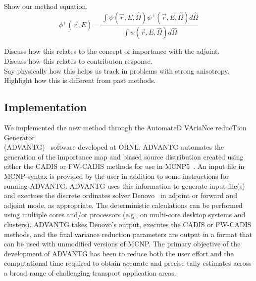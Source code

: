 \documentclass[12pt]{article}
\begin{document}
Show our method equation. \\


\begin{equation} 
\label{eq:angularhybrid}
\phi^{+}(\vec{r},E) = \frac{\int \psi(\vec {r} ,E,\hat{\Omega})\psi^+(\vec {r} ,E,\hat{\Omega})d\hat\Omega }{\int\psi(\vec {r} ,E,\hat{\Omega})d\hat\Omega}
\end{equation}


Discuss how this relates to the concept of importance with the adjoint. \\
Discuss how this relates to contributon response. \\
Say physically how this helps us track in problems with strong anisotropy. \\
Highlight how this is different from past methods.

%

\subsection{Implementation}
\label{subsect::implementation}

We implemented the new method through the AutomateD VAriaNce reducTion Generator\\ (ADVANTG)~\cite{wagner_automated_2002, mosher_new_2010} software developed at ORNL. 
ADVANTG automates the generation of the importance map and biased source distribution created using either the CADIS or FW-CADIS methods for use in MCNP5~\cite{brown_mcnp_2002}. 
An input file in MCNP syntax is provided by the user in addition to some instructions for running ADVANTG. 
ADVANTG uses this information to generate input file(s) and exectues the discrete ordinates solver Denovo~\cite{evans_denovo:_2010} in adjoint or forward and adjoint mode, as appropriate.
The deterministic calculations can be performed using multiple cores and/or processors (e.g., on multi-core desktop systems and clusters). 
ADVANTG takes Denovo's output, executes the CADIS or FW-CADIS methods, and the final variance reduction parameters are output in a format that can be used with unmodified versions of MCNP. 
The primary objective of the development of ADVANTG has been to reduce both the user effort and the computational time required to obtain accurate and precise tally estimates
across a broad range of challenging transport application areas.
\end{document}
